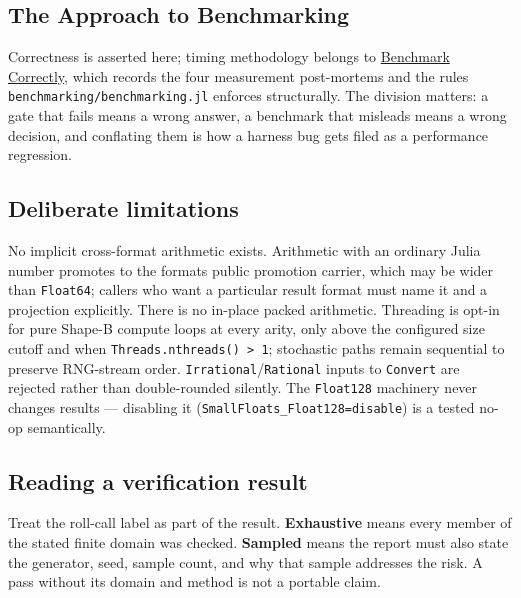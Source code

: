 \subsection{The Approach to Benchmarking}



\label{17637645545004941325}{}


Correctness is asserted here; timing methodology belongs to \href{internals\_\allowbreak{}benchmark.md}{Benchmark Correctly}, which records the four measurement post-mortems and the rules \texttt{benchmarking/\allowbreak{}benchmarking.jl} enforces structurally. The division matters: a gate that fails means a wrong answer, a benchmark that misleads means a wrong decision, and conflating them is how a harness bug gets filed as a performance regression.



\subsection{Deliberate limitations}



\label{16229184572553167566}{}


No implicit cross-format arithmetic exists. Arithmetic with an ordinary Julia number promotes to the format{\textquotesingle}s public promotion carrier, which may be wider than \texttt{Float64}; callers who want a particular result format must name it and a projection explicitly. There is no in-place packed arithmetic. Threading is opt-in for pure Shape-B compute loops at every arity, only above the configured size cutoff and when \texttt{Threads.nthreads() > 1}; stochastic paths remain sequential to preserve RNG-stream order. \texttt{Irrational}/\allowbreak\texttt{Rational} inputs to \texttt{Convert} are rejected rather than double-rounded silently. The \texttt{Float128} machinery never changes results — disabling it (\texttt{SmallFloats\_\allowbreak{}Float128=disable}) is a tested no-op semantically.



\subsection{Reading a verification result}



\label{694105434653918682}{}


Treat the roll-call label as part of the result. \textbf{Exhaustive} means every member of the stated finite domain was checked. \textbf{Sampled} means the report must also state the generator, seed, sample count, and why that sample addresses the risk. A pass without its domain and method is not a portable claim.



